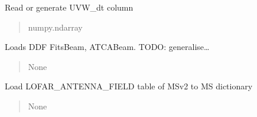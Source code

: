 \documentclass[letterpaper,10pt,english]{sphinxmanual}
\begin{document}
\begin{fulllineitems}
\begin{fulllineitems}
\label{\detokenize{api/killMS.Data:killMS.Data.ClassMS.ClassMS.Give_dUVW_dt}}
\pysigstartsignatures
{}
\pysigstopsignatures
\sphinxAtStartPar
Read or generate UVW\_dt column
\begin{quote}\begin{description}
\sphinxAtStartPar
numpy.ndarray

\end{description}\end{quote}

\end{fulllineitems}


\begin{fulllineitems}
\label{\detokenize{api/killMS.Data:killMS.Data.ClassMS.ClassMS.LoadDDFBeam}}
\pysigstartsignatures
{}
\pysigstopsignatures
\sphinxAtStartPar
Loads DDF FitsBeam, ATCABeam. TODO: generalise…
\begin{quote}\begin{description}
\sphinxAtStartPar
None

\end{description}\end{quote}

\end{fulllineitems}


\begin{fulllineitems}
\label{\detokenize{api/killMS.Data:killMS.Data.ClassMS.ClassMS.LoadLOFAR_ANTENNA_FIELD}}
\pysigstartsignatures
{}
\pysigstopsignatures
\sphinxAtStartPar
Load LOFAR\_ANTENNA\_FIELD table of MSv2 to MS dictionary
\begin{quote}\begin{description}
\sphinxAtStartPar
None


\end{description}
\end{quote}
\end{fulllineitems}
\end{fulllineitems}
\end{document}
